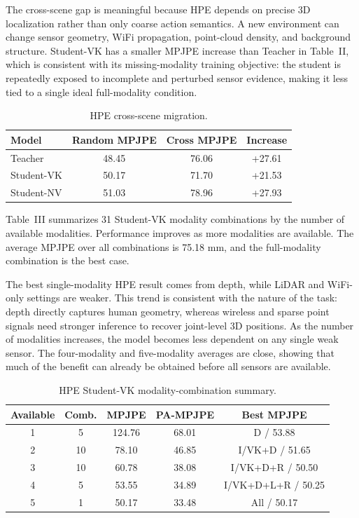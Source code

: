 \documentclass[journal, twocolumn, transmag]{IEEEtran}
\newcommand{\smalltab}{\scriptsize}
\begin{document}
The cross-scene gap is meaningful because HPE depends on precise 3D localization rather than only coarse action semantics. A new environment can change sensor geometry, WiFi propagation, point-cloud density, and background structure. Student-VK has a smaller MPJPE increase than Teacher in Table~II, which is consistent with its missing-modality training objective: the student is repeatedly exposed to incomplete and perturbed sensor evidence, making it less tied to a single ideal full-modality condition.

\begin{table}[t]
	\caption{HPE cross-scene migration.}
	\label{tab:hpe-cross}
	\centering
	\smalltab
	\begin{tabular}{lccc}
		\toprule
		Model & Random MPJPE & Cross MPJPE & Increase\\
		\midrule
		Teacher & 48.45 & 76.06 & +27.61\\
		Student-VK & 50.17 & 71.70 & +21.53\\
		Student-NV & 51.03 & 78.96 & +27.93\\
		\bottomrule
	\end{tabular}
\end{table}

Table~III summarizes 31 Student-VK modality combinations by the number of available modalities. Performance improves as more modalities are available. The average MPJPE over all combinations is 75.18 mm, and the full-modality combination is the best case.

The best single-modality HPE result comes from depth, while LiDAR and WiFi-only settings are weaker. This trend is consistent with the nature of the task: depth directly captures human geometry, whereas wireless and sparse point signals need stronger inference to recover joint-level 3D positions. As the number of modalities increases, the model becomes less dependent on any single weak sensor. The four-modality and five-modality averages are close, showing that much of the benefit can already be obtained before all sensors are available.

\begin{table}[t]
	\caption{HPE Student-VK modality-combination summary.}
	\label{tab:hpe-combo}
	\centering
	\smalltab
	\begin{tabular}{ccccc}
		\toprule
		Available & Comb. & MPJPE & PA-MPJPE & Best MPJPE\\
		\midrule
		1 & 5 & 124.76 & 68.01 & D / 53.88\\
		2 & 10 & 78.10 & 46.85 & I/VK+D / 51.65\\
		3 & 10 & 60.78 & 38.08 & I/VK+D+R / 50.50\\
		4 & 5 & 53.55 & 34.89 & I/VK+D+L+R / 50.25\\
		5 & 1 & 50.17 & 33.48 & All / 50.17\\
		\bottomrule
	\end{tabular}
\end{table}
\end{document}
